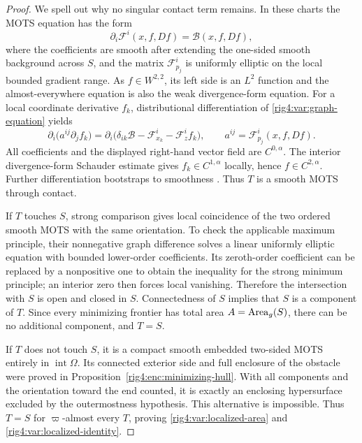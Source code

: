 \begin{proof}
We spell out why no singular contact term remains. In these charts the
MOTS equation has the form
\begin{equation}
 \partial_i\mathcal F^i(x,f,Df)=\mathcal B(x,f,Df),
\label{rig4:var:graph-equation}
\end{equation}
where the coefficients are smooth after extending the one-sided smooth
background across $S$, and the matrix
$\mathcal F^i_{p_j}$ is uniformly elliptic on the local bounded gradient
range. As $f\in W^{2,2}$, its left side is an $L^2$ function and the
almost-everywhere equation is also the weak divergence-form equation.
For a local coordinate derivative $f_k$, distributional differentiation
of \eqref{rig4:var:graph-equation} yields
\[
 \partial_i\bigl(a^{ij}\partial_j f_k\bigr)
   =\partial_i\bigl(\delta_{ik}\mathcal B
             -\mathcal F^i_{x_k}-\mathcal F^i_z f_k\bigr),
 \qquad a^{ij}=\mathcal F^i_{p_j}(x,f,Df).
\]
All coefficients and the displayed right-hand vector field are
$C^{0,\alpha}$. The interior divergence-form Schauder estimate gives
$f_k\in C^{1,\alpha}$ locally, hence $f\in C^{2,\alpha}$.
Further differentiation bootstraps to smoothness
\cite{GilbargTrudinger2001}. Thus $T$ is a smooth MOTS through contact.

If $T$ touches $S$, strong comparison gives local coincidence of the two
ordered smooth MOTS with the same orientation. To check the applicable
maximum principle, their nonnegative graph difference solves a linear
uniformly elliptic equation with bounded lower-order coefficients. Its
zeroth-order coefficient can be replaced by a nonpositive one to obtain
the inequality for the strong minimum principle; an interior zero then
forces local vanishing. Therefore the intersection with $S$ is open and
closed in $S$. Connectedness of $S$ implies that $S$ is a component of
$T$. Since every minimizing frontier has total area $A=\operatorname{Area}_g(S)$,
there can be no additional component, and $T=S$.

If $T$ does not touch $S$, it is a compact smooth embedded two-sided MOTS
entirely in $\operatorname{int}\Omega$. Its connected exterior side and
full enclosure of the obstacle were proved in
Proposition~\ref{rig4:enc:minimizing-hull}. With all components and the
orientation toward the end counted, it is exactly an enclosing
hypersurface excluded by the outermostness hypothesis. This alternative
is impossible. Thus $T=S$ for $\varpi$-almost every $T$, proving
\eqref{rig4:var:localized-area} and \eqref{rig4:var:localized-identity}.
\end{proof}
